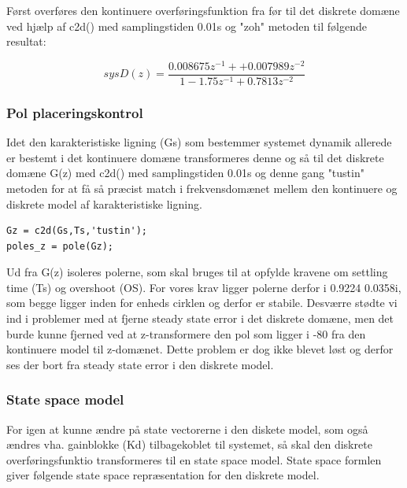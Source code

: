 Først overføres den kontinuere overføringsfunktion fra før til det diskrete domæne ved hjælp af c2d() med samplingstiden 0.01s og "zoh" metoden til følgende resultat:

\begin{equation}
sysD(z) = \frac{0.008675 z^{-1} + + 0.007989 z^{-2}}{1 - 1.75 z^{-1} + 0.7813 z^{-2}}
\end{equation}

\subsubsection{Pol placeringskontrol}
Idet den karakteristiske ligning (Gs) som bestemmer systemet dynamik allerede er bestemt i det kontinuere domæne  transformeres denne og så til det diskrete domæne G(z) med c2d() med samplingstiden 0.01s og denne gang "tustin" metoden for at få så præcist match i frekvensdomænet mellem den kontinuere og diskrete model af karakteristiske ligning. 

\begin{lstlisting}[frame=single]
Gz = c2d(Gs,Ts,'tustin');
poles_z = pole(Gz);
\end{lstlisting}

Ud fra G(z) isoleres polerne, som skal bruges til at opfylde kravene om settling time (Ts) og overshoot (OS). For vores krav ligger polerne  derfor i 0.9224 \textpm0.0358i, som begge ligger inden for enheds cirklen og derfor er stabile.  
Desværre stødte vi ind i problemer med at fjerne steady state error i det diskrete domæne, men det burde kunne fjerned ved at z-transformere den pol som ligger i -80 fra den kontinuere model til z-domænet. Dette problem er dog ikke blevet løst og derfor ses der bort fra steady state error i den diskrete model.

\subsubsection{State space model}

 For igen at kunne ændre på state vectorerne i den diskete model, som også ændres vha. gainblokke (Kd) tilbagekoblet til systemet, så skal den diskrete overføringsfunktio transformeres til en state space model. State space formlen giver følgende state space repræsentation for den  diskrete model.

